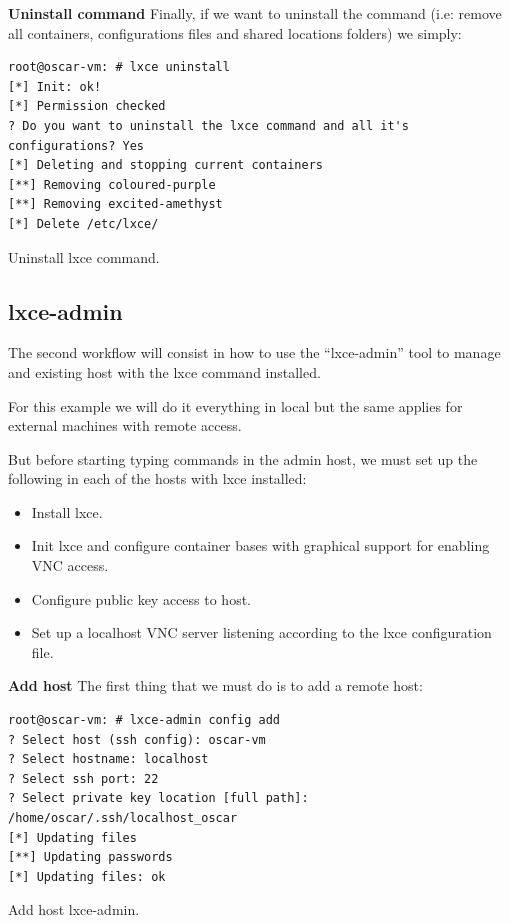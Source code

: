 \textbf{Uninstall command}
Finally, if we want to uninstall the command (i.e: remove all containers, configurations files and shared locations folders) we simply:
\begin{listing}[H]
\begin{verbatim}
root@oscar-vm: # lxce uninstall
[*] Init: ok!
[*] Permission checked
? Do you want to uninstall the lxce command and all it's configurations? Yes
[*] Deleting and stopping current containers
[**] Removing coloured-purple
[**] Removing excited-amethyst
[*] Delete /etc/lxce/
\end{verbatim}
\caption[lxce uninstall]{\footnotesize{Uninstall lxce command.}}
\end{listing}


\subsection{lxce-admin}
The second workflow will consist in how to use the ``lxce-admin'' tool to manage and existing host with the lxce command installed.

For this example we will do it everything in local but the same applies for external machines with remote access.

But before starting typing commands in the admin host, we must set up the following in each of the hosts with lxce installed:
\begin{itemize}
	\item{Install lxce.}
	\item{Init lxce and configure container bases with graphical support for enabling VNC access.}
	\item{Configure public key access to host.}
	\item{Set up a localhost VNC server listening according to the lxce configuration file.}
\end{itemize}

\textbf{Add host}
The first thing that we must do is to add a remote host:
\begin{listing}[H]
\begin{verbatim}
root@oscar-vm: # lxce-admin config add
? Select host (ssh config): oscar-vm
? Select hostname: localhost
? Select ssh port: 22
? Select private key location [full path]: /home/oscar/.ssh/localhost_oscar
[*] Updating files
[**] Updating passwords
[*] Updating files: ok
\end{verbatim}
\caption[lxce-admin config add]{\footnotesize{Add host lxce-admin.}}
\end{listing}

